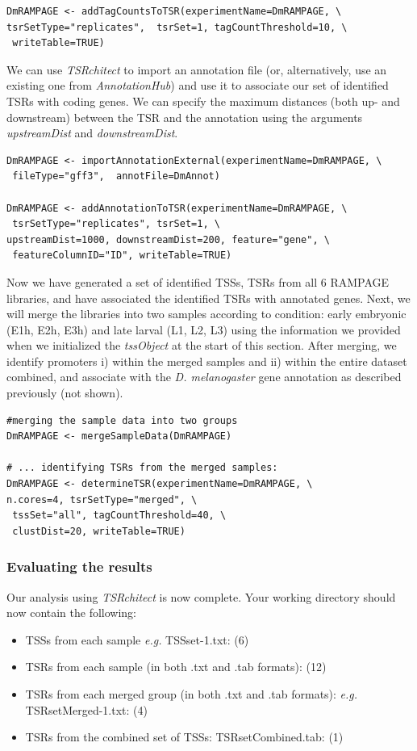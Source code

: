 \documentclass[runningheads,a4paper]{llncs}
\begin{document}
\begin{linenumbers}
\noindent
\begin{verbatim}
DmRAMPAGE <- addTagCountsToTSR(experimentName=DmRAMPAGE, \
tsrSetType="replicates",  tsrSet=1, tagCountThreshold=10, \
 writeTable=TRUE)
\end{verbatim}

We can use \textit{TSRchitect} to import an annotation file (or, alternatively, use an existing one from \textit{AnnotationHub}) and use it to associate our set of identified TSRs with coding genes. 
We can specify the maximum distances (both up- and downstream) between the TSR and the annotation using the arguments \textit{upstreamDist} and \textit{downstreamDist}.

\noindent
\begin{verbatim}
DmRAMPAGE <- importAnnotationExternal(experimentName=DmRAMPAGE, \
 fileType="gff3",  annotFile=DmAnnot)

DmRAMPAGE <- addAnnotationToTSR(experimentName=DmRAMPAGE, \
 tsrSetType="replicates", tsrSet=1, \
upstreamDist=1000, downstreamDist=200, feature="gene", \
 featureColumnID="ID", writeTable=TRUE)
\end{verbatim}

Now we have generated a set of identified TSSs, TSRs from all 6 RAMPAGE libraries, and have associated the identified TSRs with annotated genes. 
Next, we will merge the libraries into two samples according to condition: early embryonic (E1h, E2h, E3h) and late larval (L1, L2, L3) using the information we provided when we initialized the \textit{tssObject} at the start of this section.
After merging, we identify promoters i) within the merged samples and ii) within the entire dataset combined, and associate with the \textit{D. melanogaster} gene annotation as described previously (not shown).

\noindent
\begin{verbatim}
#merging the sample data into two groups
DmRAMPAGE <- mergeSampleData(DmRAMPAGE)

# ... identifying TSRs from the merged samples:
DmRAMPAGE <- determineTSR(experimentName=DmRAMPAGE, \
n.cores=4, tsrSetType="merged", \
 tssSet="all", tagCountThreshold=40, \
 clustDist=20, writeTable=TRUE)
\end{verbatim}

\subsubsection{Evaluating the results}
Our analysis using \textit{TSRchitect} is now complete.
Your working directory should now contain the following: 
\begin{itemize}
\item TSSs from each sample \textit{e.g.} TSSset-1.txt: (6)
\item TSRs from each sample (in both .txt and .tab formats): (12)
\item TSRs from each merged group (in both .txt and .tab formats): \textit{e.g.} TSRsetMerged-1.txt: (4)
\item TSRs from the combined set of TSSs: TSRsetCombined.tab: (1)
\end{itemize} \\


\end{linenumbers}
\end{document}
